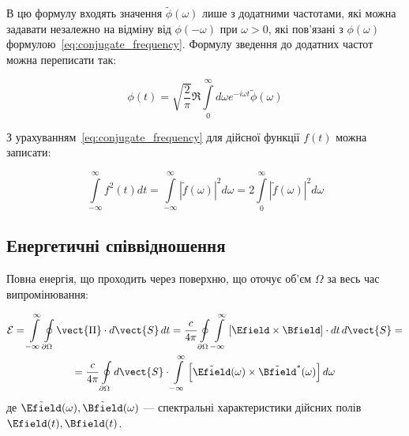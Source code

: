 В цю формулу входять значення \( \tilde{\phi}(\omega) \) лише з додатними частотами, які можна задавати незалежно на
відміну від \( \phi(-\omega) \) при \( \omega > 0 \), які пов'язані з \( \phi(\omega) \)
формулою~\eqref{eq:conjugate_frequency}. Формулу зведення до додатних частот можна переписати так:

\begin{equation}
	\phi(t) = \sqrt{\frac{2}{\pi}} \Re \int\limits_{0}^{\infty} d\omega e^{-i\omega t} \tilde{\phi}(\omega)
	\label{eq:positive_frequencies}
\end{equation}

З урахуванням~\eqref{eq:conjugate_frequency} для дійсної функції \( f(t) \) можна записати:

\begin{equation*}
	\int\limits_{-\infty}^{\infty} f^2(t) dt = \int\limits_{-\infty}^{\infty} |\tilde{f}(\omega)|^2 d\omega = 2\int\limits_{0}^{\infty} |\tilde{f}(\omega)|^2
	d\omega
\end{equation*}

\subsection*{Енергетичні співвідношення}

Повна енергія, що проходить через поверхню, що оточує об'єм \( \Omega \) за весь час випромінювання:

\begin{multline*}
	\mathcal{E} = \int\limits_{-\infty}^{\infty} \oint\limits_{\partial\Omega} \vect{\Pi} \cdot d\vect{S}\, dt = \frac{c}{4\pi} \oint\limits_{\partial\Omega} \int\limits_{-\infty}^{\infty}
	\left[ \Efield \times \Bfield \right] \cdot dt\, d\vect{S} = \\
	= \frac{c}{4\pi} \oint\limits_{\partial\Omega} d\vect{S} \cdot \int\limits_{-\infty}^{\infty} \left[ \tilde{\Efield}(\omega) \times \tilde{\Bfield}^{*}(\omega) \right] d\omega
\end{multline*}
де \( \tilde{\Efield}(\omega), \tilde{\Bfield}(\omega) \) --- спектральні характеристики дійсних полів \( \Efield(t),
\Bfield(t) \).


